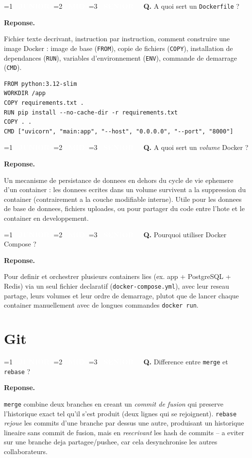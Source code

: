 \documentclass[11pt,a4paper]{article}
\newcommand{\badgeJ}{\textcolor{white}{\colorbox{junior}{\small\bfseries\ JUNIOR\ }}}
\newcommand{\badgeM}{\textcolor{white}{\colorbox{mid}{\small\bfseries\ MID\ }}}
\newcommand{\badgeS}{\textcolor{white}{\colorbox{senior}{\small\bfseries\ SENIOR\ }}}
\newcounter{qcount}
\newenvironment{qa}[2]{%
  \stepcounter{qcount}%
  \par\vspace{6pt}%
  \noindent\colorbox{qbg}{\parbox{\dimexpr\linewidth-12pt}{\vspace{2pt}%
  \ifnum#1=1 \badgeJ\fi\ifnum#1=2 \badgeM\fi\ifnum#1=3 \badgeS\fi
  \ \textbf{Q\theqcount.} #2\vspace{2pt}}}\par\vspace{4pt}%
  \noindent\textbf{\color{accent}Reponse.}\ \ignorespaces
}{%
  \par\vspace{8pt}%
}
\begin{document}
\begin{qa}{1}{A quoi sert un \texttt{Dockerfile} ?}
Fichier texte decrivant, instruction par instruction, comment construire une
image Docker : image de base (\texttt{FROM}), copie de fichiers
(\texttt{COPY}), installation de dependances (\texttt{RUN}), variables
d'environnement (\texttt{ENV}), commande de demarrage (\texttt{CMD}).
\begin{lstlisting}
FROM python:3.12-slim
WORKDIR /app
COPY requirements.txt .
RUN pip install --no-cache-dir -r requirements.txt
COPY . .
CMD ["uvicorn", "main:app", "--host", "0.0.0.0", "--port", "8000"]
\end{lstlisting}
\end{qa}

\begin{qa}{2}{A quoi sert un \emph{volume} Docker ?}
Un mecanisme de persistance de donnees en dehors du cycle de vie ephemere
d'un container : les donnees ecrites dans un volume survivent a la
suppression du container (contrairement a la couche modifiable interne). Utile
pour les donnees de base de donnees, fichiers uploades, ou pour partager du
code entre l'hote et le container en developpement.
\end{qa}

\begin{qa}{2}{Pourquoi utiliser Docker Compose ?}
Pour definir et orchestrer plusieurs containers lies (ex. app +
PostgreSQL + Redis) via un seul fichier declaratif
(\texttt{docker-compose.yml}), avec leur reseau partage, leurs volumes et
leur ordre de demarrage, plutot que de lancer chaque container manuellement
avec de longues commandes \texttt{docker run}.
\end{qa}

\newpage
\section{Git}

\begin{qa}{1}{Difference entre \texttt{merge} et \texttt{rebase} ?}
\texttt{merge} combine deux branches en creant un \emph{commit de fusion}
qui preserve l'historique exact tel qu'il s'est produit (deux lignes qui se
rejoignent). \texttt{rebase} \emph{rejoue} les commits d'une branche par
dessus une autre, produisant un historique lineaire sans commit de fusion,
mais en \emph{reecrivant} les hash de commits -- a eviter sur une branche deja
partagee/pushee, car cela desynchronise les autres collaborateurs.
\end{qa}
\end{document}
